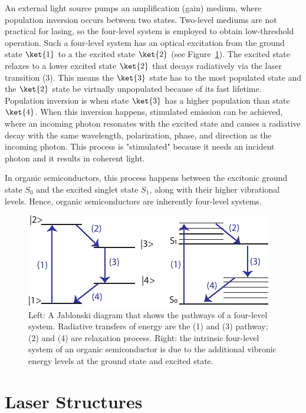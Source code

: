 \documentclass[
  letterpaper,
  DIV=11,
  numbers=noendperiod,
  oneside]{scrreprt}
\begin{document}
An external light source pumps an amplification (gain) medium, where
population inversion occurs between two states. Two-level mediums are
not practical for lasing, so the four-level system is employed to obtain
low-threshold operation. Such a four-level system has an optical
excitation from the ground state \(\ket{1}\) to a the excited state
\(\ket{2}\) (see Figure~\ref{fig-laserpath}). The excited state relaxes
to a lower excited state \(\ket{2}\) that decays radiatively via the
laser transition (3). This means the \(\ket{3}\) state has to the most
populated state and the \(\ket{2}\) state be virtually unpopulated
because of its fast lifetime. Population inversion is when state
\(\ket{3}\) has a higher population than state \(\ket{4}\). When this
inversion happens, stimulated emission can be achieved, where an
incoming photon resonates with the excited state and causes a radiative
decay with the same wavelength, polarization, phase, and direction as
the incoming photon. This process is "stimulated" because it needs an
incident photon and it results in coherent light.

In organic semiconductors, this process happens between the excitonic
ground state \(S_0\) and the excited singlet state \(S_1\), along with
their higher vibrational levels. Hence, organic semiconductors are
inherently four-level systems.

\begin{figure}

{\centering \includegraphics{./images/laserpath.pdf}

}

\caption{\label{fig-laserpath}Left: A Jablonski diagram that shows the
pathways of a four-level system. Radiative transfers of energy are the
(1) and (3) pathway; (2) and (4) are relaxation process. Right: the
intrinsic four-level system of an organic semiconductor is due to the
additional vibronic energy levels at the ground state and excited
state.}

\end{figure}

\hypertarget{laser-structures}{%
\section{Laser Structures}\label{laser-structures}}
\end{document}
